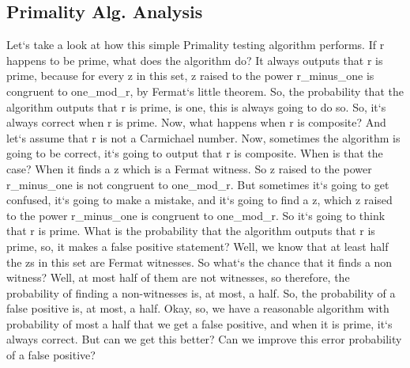 \subsection{Primality Alg.
Analysis}
Let`s take a look at how this simple Primality testing algorithm performs.
If r happens to be prime, what does the algorithm do? It always outputs that r is prime, because for every z in this set, z raised to the power r\_minus\_one is congruent to one\_mod\_r, by Fermat`s little theorem.
So, the probability that the algorithm outputs that r is prime, is one, this is always going to do so.
So, it`s always correct when r is prime.
Now, what happens when r is composite? And let`s assume that r is not a Carmichael number.
Now, sometimes the algorithm is going to be correct, it`s going to output that r is composite.
When is that the case? When it finds a z which is a Fermat witness.
So z raised to the power r\_minus\_one is not congruent to one\_mod\_r.
But sometimes it`s going to get confused, it`s going to make a mistake, and it`s going to find a z, which z raised to the power r\_minus\_one is congruent to one\_mod\_r.
So it`s going to think that r is prime.
What is the probability that the algorithm outputs that r is prime, so, it makes a false positive statement? Well, we know that at least half the zs in this set are Fermat witnesses.
So what`s the chance that it finds a non witness? Well, at most half of them are not witnesses, so therefore, the probability of finding a non-witnesses is, at most, a half.
So, the probability of a false positive is, at most, a half.
Okay, so, we have a reasonable algorithm with probability of most a half that we get a false positive, and when it is prime, it`s always correct.
But can we get this better? Can we improve this error probability of a false positive?

